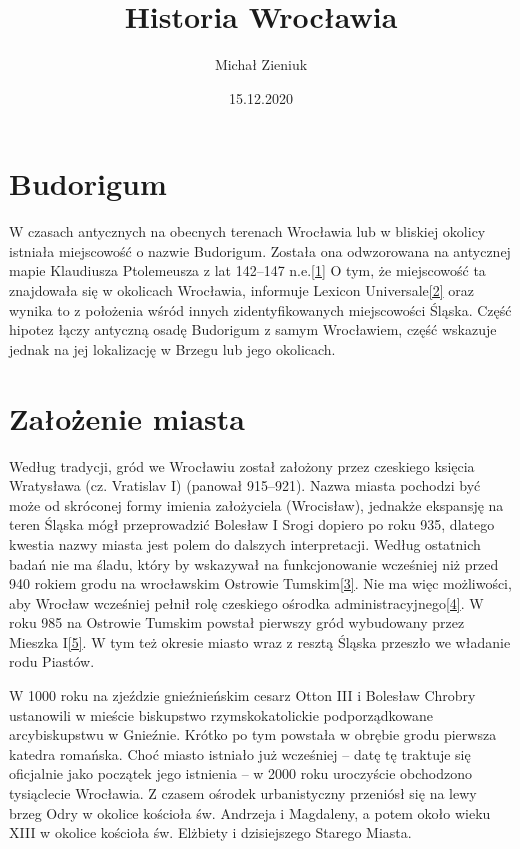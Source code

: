 \documentclass{article}
\title{Historia Wrocławia}
\author{Michał Zieniuk}
\date{15.12.2020}
\begin{document}
\maketitle
\pagestyle{empty}

\tableofcontents

\section*{Budorigum}

W czasach antycznych na obecnych terenach Wrocławia lub w bliskiej okolicy istniała miejscowość o nazwie Budorigum. Została ona odwzorowana na antycznej mapie Klaudiusza Ptolemeusza z lat 142–147 n.e.\hyperref[1]{[1]}\label{11} O tym, że miejscowość ta znajdowała się w okolicach Wrocławia, informuje Lexicon Universale\hyperref[2]{[2]}\label{12} oraz wynika to z położenia wśród innych zidentyfikowanych miejscowości Śląska. Część hipotez łączy antyczną osadę Budorigum z samym Wrocławiem, część  wskazuje jednak na jej lokalizację w Brzegu lub jego okolicach.



\section*{Założenie miasta}

Według tradycji, gród we Wrocławiu został założony przez czeskiego księcia Wratysława (cz. Vratislav I) (panował 915–921). Nazwa miasta pochodzi być może od skróconej formy imienia założyciela (Wrocisław), jednakże ekspansję na teren Śląska mógł przeprowadzić Bolesław I Srogi dopiero po roku 935, dlatego kwestia nazwy miasta jest polem do dalszych interpretacji. Według ostatnich badań nie ma śladu, który by wskazywał na funkcjonowanie wcześniej niż przed 940 rokiem grodu na wrocławskim Ostrowie Tumskim\hyperref[3]{[3]}\label{13}. Nie ma więc możliwości, aby Wrocław wcześniej pełnił rolę czeskiego ośrodka administracyjnego\hyperref[4]{[4]}\label{14}. W roku 985 na Ostrowie Tumskim powstał pierwszy gród wybudowany przez Mieszka I\hyperref[5]{[5]}\label{15}. W tym też okresie miasto wraz z resztą Śląska przeszło we władanie rodu Piastów.

\vspace{6pt}

\noindent W 1000 roku na zjeździe gnieźnieńskim cesarz Otton III i Bolesław Chrobry ustanowili w mieście biskupstwo rzymskokatolickie podporządkowane arcybiskupstwu w Gnieźnie. Krótko po tym powstała w obrębie grodu pierwsza katedra romańska. Choć miasto istniało już wcześniej – datę tę traktuje się oficjalnie jako początek jego istnienia – w 2000 roku uroczyście obchodzono tysiąclecie Wrocławia. Z czasem ośrodek urbanistyczny przeniósł się na lewy brzeg Odry w okolice kościoła św. Andrzeja i Magdaleny, a potem około wieku XIII w okolice kościoła św. Elżbiety i dzisiejszego Starego Miasta.
\end{document}
